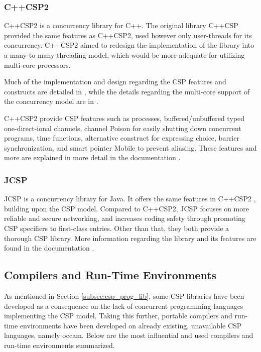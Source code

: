 \subsubsection{C++CSP2}
\label{sssec:c++csp2}

C++CSP2 \citep{c++csp2} is a concurrency library for C++. The original library C++CSP \citep{c++csp} provided the same features as C++CSP2, used however only user-threads for its concurrency. C++CSP2 aimed to redesign the implementation of the library into a many-to-many threading model, which would be more adequate for utilizing multi-core processors. 

Much of the implementation and design regarding the CSP features and constructs are detailed in \citet{c++csp}, while the details regarding the multi-core support of the concurrency model are in \citet{c++csp2}.

C++CSP2 provide CSP features such as processes, buffered/unbuffered typed one-direct\hyp{}ional channels, channel Poison for easily shutting down concurrent programs, time functions, alternative construct for expressing choice, barrier synchronization, and smart pointer Mobile to prevent aliasing. These features and more are explained in more detail in the documentation \citep{c++csp2doc}.


\subsubsection{JCSP}
\label{sssec:jcsp}

JCSP \citep{jcsp} is a concurrency library for Java. It offers the same features in C++CSP2 \citep{c++csp2}, building upon the CSP model. Compared to C++CSP2, JCSP focuses on more reliable and secure networking, and increases coding safety through promoting CSP specifiers to first-class entries. Other than that, they both provide a thorough CSP library. More information regarding the library and its features are found in the documentation \citep{jcspdoc}. 


\subsection{Compilers and Run-Time Environments}
\label{subsec:csp_comp_runtime}

As mentioned in Section \ref{subsec:csp_prog_lib}, some CSP libraries have been developed as a consequence on the lack of concurrent programming languages implementing the CSP model. Taking this further, portable compilers and run-time environments have been developed on already existing, unavailable CSP languages, namely occam. Below are the most influential and used compilers and run-time environments summarized. 


